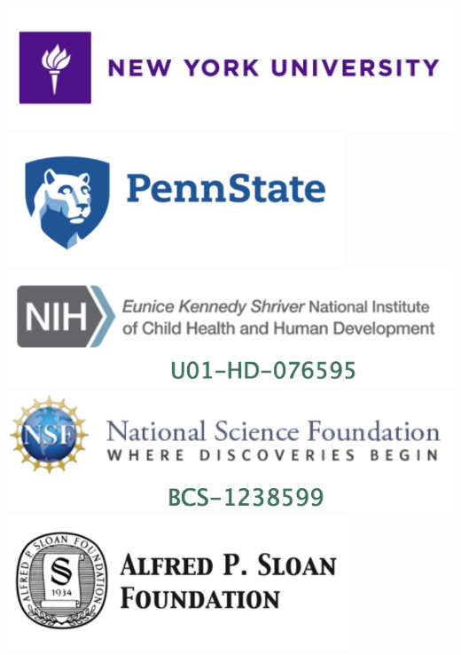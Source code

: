 \documentclass[landscape,final,paperwidth=75in,paperheight=48in,fontscale=0.285]{baposter}
\begin{document}
\begin{poster}
{\begin{center}
\end{center}
}
{
\begin{center}
    \includegraphics[scale=0.5,valign=t]{img/nyu.png}
    \hspace{4em}
    \includegraphics[scale=0.5,valign=t]{img/psu.png}
    \includegraphics[scale=0.5,valign=t]{img/nichd.png}
    \hspace{4em}
    \includegraphics[scale=0.5,valign=t]{img/nsf.png}
    \includegraphics[scale=0.5,valign=t]{img/sloan.png}

\end{center}}
\end{poster}
\end{document}
